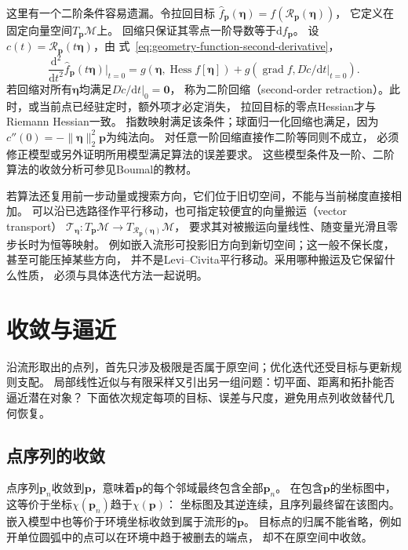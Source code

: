 这里有一个二阶条件容易遗漏。令拉回目标
$\widehat f_{\bm p}(\bm\eta)=f(\mathcal R_{\bm p}(\bm\eta))$，
它定义在固定向量空间$T_{\bm p}\mathcal M$上。
回缩只保证其零点一阶导数等于$\mathrm df_{\bm p}$。
设$c(t)=\mathcal R_{\bm p}(t\bm\eta)$，由
式~\eqref{eq:geometry-function-second-derivative}，
\begin{equation}
 \frac{\mathrm d^2}{\mathrm dt^2}\widehat f_{\bm p}(t\bm\eta)
 \bigg|_{t=0}
 =g(\bm\eta,\operatorname{Hess}f[\bm\eta])
  +g(\operatorname{grad}f,D\dot c/\mathrm dt|_{t=0}).
 \label{eq:geometry-retraction-pullback-hessian}
\end{equation}
若回缩对所有$\bm\eta$均满足$D\dot c/\mathrm dt|_0=\bm0$，
称为二阶回缩（second-order retraction）。此时，或当前点已经驻定时，额外项才必定消失，
拉回目标的零点Hessian才与Riemann Hessian一致。
指数映射满足该条件；球面归一化回缩也满足，因为
$c''(0)=-\lVert\bm\eta\rVert_2^2\bm p$为纯法向。
对任意一阶回缩直接作二阶等同则不成立，
必须修正模型或另外证明所用模型满足算法的误差要求。
这些模型条件及一阶、二阶算法的收敛分析可参见Boumal的教材。

若算法还复用前一步动量或搜索方向，它们位于旧切空间，不能与当前梯度直接相加。
可以沿已选路径作平行移动，也可指定较便宜的向量搬运（vector transport）
$\mathcal T_{\bm\eta}:T_{\bm p}\mathcal M\to
T_{\mathcal R_{\bm p}(\bm\eta)}\mathcal M$，
要求其对被搬运向量线性、随变量光滑且零步长时为恒等映射。
例如嵌入流形可投影旧方向到新切空间；这一般不保长度，甚至可能压掉某些方向，
并不是Levi--Civita平行移动。采用哪种搬运及它保留什么性质，
必须与具体迭代方法一起说明。

\section{收敛与逼近}
\label{sec:geometry-convergence-approximation}

沿流形取出的点列，首先只涉及极限是否属于原空间；优化迭代还受目标与更新规则支配。
局部线性近似与有限采样又引出另一组问题：切平面、距离和拓扑能否逼近潜在对象？
下面依次规定每项的目标、误差与尺度，避免用点列收敛替代几何恢复。

\subsection{点序列的收敛}
\label{sec:geometry-point-convergence}

点序列$\bm p_n$收敛到$\bm p$，意味着$\bm p$的每个邻域最终包含全部$\bm p_n$。
在包含$\bm p$的坐标图中，这等价于坐标$\chi(\bm p_n)$趋于$\chi(\bm p)$：
坐标图及其逆连续，且序列最终留在该图内。嵌入模型中也等价于环境坐标收敛到属于流形的$\bm p$。
目标点的归属不能省略，例如开单位圆弧中的点可以在环境中趋于被删去的端点，
却不在原空间中收敛。

